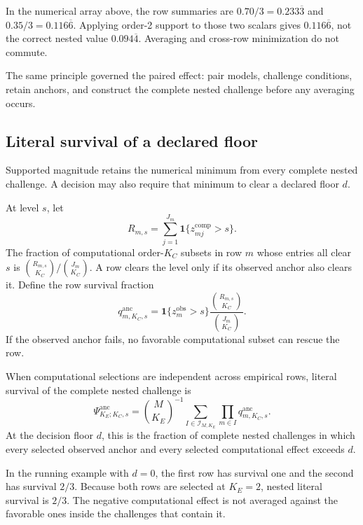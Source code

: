\documentclass[11pt]{article}
\newcommand{\Psianc}{\Psi^{\mathrm{anc}}}
\theoremstyle{remark}
\begin{document}
In the numerical array above, the row summaries are
$0.70/3=0.233\overline3$ and $0.35/3=0.116\overline6$. Applying order-2
support to those two scalars gives $0.116\overline6$, not the correct nested
value $0.094\overline4$. Averaging and cross-row minimization do not commute.

The same principle governed the paired effect: pair models, challenge
conditions, retain anchors, and construct the complete nested challenge before
any averaging occurs.

\subsection{Literal survival of a declared floor}

Supported magnitude retains the numerical minimum from every complete nested
challenge. A decision may also require that minimum to clear a declared floor
$d$.

At level $s$, let
\[
R_{m,s}
=
\sum_{j=1}^{J_m}
\mathbf 1\{z_{mj}^{\mathrm{comp}}>s\}.
\]
The fraction of computational order-$K_C$ subsets in row $m$ whose entries all
clear $s$ is
$\binom{R_{m,s}}{K_C}/\binom{J_m}{K_C}$. A row clears the level only if its
observed anchor also clears it. Define the row survival fraction
\begin{equation}
q^{\mathrm{anc}}_{m,K_C,s}
=
\mathbf 1\{z_m^{\mathrm{obs}}>s\}
\frac{\binom{R_{m,s}}{K_C}}
{\binom{J_m}{K_C}}.
\label{eq:row-survival}
\end{equation}
If the observed anchor fails, no favorable computational subset can rescue the
row.

When computational selections are independent across empirical rows, literal
survival of the complete nested challenge is
\begin{equation}
\Psianc_{K_E;K_C,s}
=
\binom{M}{K_E}^{-1}
\sum_{I\in\mathcal I_{M,K_E}}
\prod_{m\in I}q^{\mathrm{anc}}_{m,K_C,s}.
\label{eq:anchored-survival}
\end{equation}
At the decision floor $d$, this is the fraction of complete nested challenges
in which every selected observed anchor and every selected computational
effect exceeds $d$.

In the running example with $d=0$, the first row has survival one and the
second has survival $2/3$. Because both rows are selected at $K_E=2$, nested
literal survival is $2/3$. The negative computational effect is not averaged
against the favorable ones inside the challenges that contain it.
\end{document}
